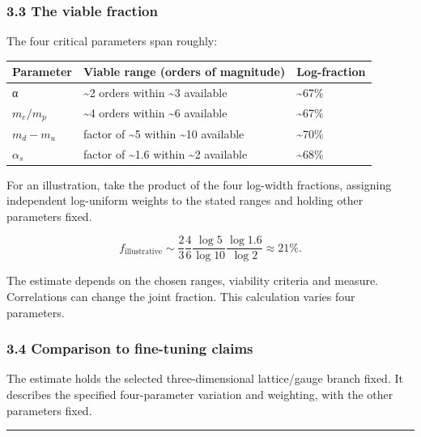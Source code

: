 \documentclass[
]{article}
\begin{document}
\hypertarget{the-viable-fraction}{%
\subsubsection{3.3 The viable fraction}\label{the-viable-fraction}}

The four critical parameters span roughly:

\begin{longtable}[]{@{}lll@{}}
\toprule\noalign{}
Parameter & Viable range (orders of magnitude) & Log-fraction \\
\midrule\noalign{}
\endhead
\bottomrule\noalign{}
\endlastfoot
α & \textasciitilde2 orders within \textasciitilde3 available &
\textasciitilde67\% \\
\(m_e / m_p\) & \textasciitilde4 orders within \textasciitilde6
available & \textasciitilde67\% \\
\(m_d - m_u\) & factor of \textasciitilde5 within \textasciitilde10
available & \textasciitilde70\% \\
\(\alpha_s\) & factor of \textasciitilde1.6 within \textasciitilde2
available & \textasciitilde68\% \\
\end{longtable}

For an illustration, take the product of the four log-width fractions,
assigning independent log-uniform weights to the stated ranges and
holding other parameters fixed.

\[f_{\text{illustrative}} \sim \frac{2}{3}\frac{4}{6}\frac{\log 5}{\log 10}\frac{\log 1.6}{\log 2} \approx 21\%.\]

The estimate depends on the chosen ranges, viability criteria and
measure. Correlations can change the joint fraction. This calculation
varies four parameters.

\hypertarget{comparison-to-fine-tuning-claims}{%
\subsubsection{3.4 Comparison to fine-tuning
claims}\label{comparison-to-fine-tuning-claims}}

The estimate holds the selected three-dimensional lattice/gauge branch
fixed. It describes the specified four-parameter variation and
weighting, with the other parameters fixed.

\begin{center}\rule{0.5\linewidth}{0.5pt}\end{center}
\end{document}
